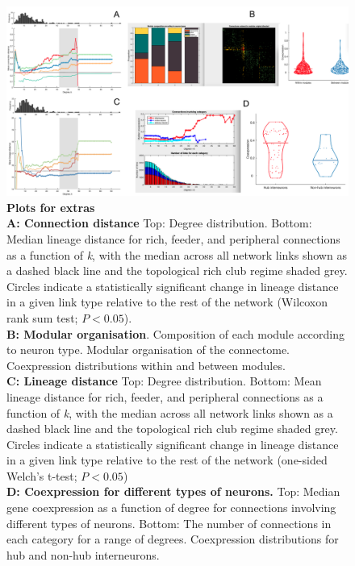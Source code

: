 \documentclass[10pt,letterpaper]{article}
\begin{document}
\begin{figure}[!h]
\centering
    \includegraphics[width=1\textwidth]{Extras.png}
 \caption{{\bf Plots for extras}\\
\textbf{A: Connection distance}
Top: Degree distribution. 
Bottom: Median lineage distance for rich, feeder, and peripheral connections as a function of \textit{k}, with the median across all network links shown as a dashed black line and the topological rich club regime shaded grey.
Circles indicate a statistically significant change in lineage distance in a given link type relative to the rest of the network (Wilcoxon rank sum test; $P < 0.05$). \\
\textbf{B: Modular organisation}. 
Composition of each module according to neuron type. 
Modular organisation of the connectome. 
Coexpression distributions within and between modules.   \\
\textbf{C: Lineage distance} 
Top: Degree distribution. Bottom: Mean lineage distance for rich, feeder, and peripheral connections as a function of \textit{k}, with the median across all network links shown as a dashed black line and the topological rich club regime shaded grey.
Circles indicate a statistically significant change in lineage distance in a given link type relative to the rest of the network (one-sided Welch’s t-test; $P < 0.05$) \\
\textbf{D: Coexpression for different types of neurons. }
Top: Median gene coexpression as a function of degree for connections involving different types of neurons. 
Bottom: The number of connections in each category for a range of degrees.
Coexpression distributions for hub and non-hub interneurons. \\
}
 \label{Modules}
 \end{figure}
 
\end{document}
